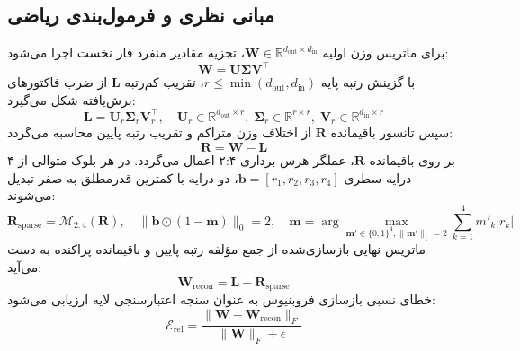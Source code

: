 \subsection{مبانی نظری و فرمول‌بندی ریاضی}
برای ماتریس وزن اولیه $\mathbf{W} \in \mathbb{R}^{d_{\text{out}} \times d_{\text{in}}}$، تجزیه مقادیر منفرد فاز نخست اجرا می‌شود:
\begin{equation}
\mathbf{W} = \mathbf{U} \mathbf{\Sigma} \mathbf{V}^\top
\end{equation}
با گزینش رتبه پایه $r \le \min(d_{\text{out}}, d_{\text{in}})$، تقریب کم‌رتبه $\mathbf{L}$ از ضرب فاکتورهای برش‌یافته شکل می‌گیرد:
\begin{equation}
\mathbf{L} = \mathbf{U}_r \mathbf{\Sigma}_r \mathbf{V}_r^\top, \quad \mathbf{U}_r \in \mathbb{R}^{d_{\text{out}} \times r}, \; \mathbf{\Sigma}_r \in \mathbb{R}^{r \times r}, \; \mathbf{V}_r \in \mathbb{R}^{d_{\text{in}} \times r}
\end{equation}
سپس تانسور باقیمانده $\mathbf{R}$ از اختلاف وزن متراکم و تقریب رتبه پایین محاسبه می‌گردد:
\begin{equation}
\mathbf{R} = \mathbf{W} - \mathbf{L}
\end{equation}
بر روی باقیمانده $\mathbf{R}$، عملگر هرس برداری ۲:۴ اعمال می‌گردد. در هر بلوک متوالی از ۴ درایه سطری $\mathbf{b} = [r_1, r_2, r_3, r_4]$، دو درایه با کمترین قدرمطلق به صفر تبدیل می‌شوند:
\begin{equation}
\mathbf{R}_{\text{sparse}} = \mathcal{M}_{2:4}(\mathbf{R}), \quad \|\mathbf{b} \odot (1 - \mathbf{m})\|_0 = 2, \quad \mathbf{m} = \arg\max_{\mathbf{m}' \in \{0, 1\}^4, \|\mathbf{m}'\|_1=2} \sum_{k=1}^4 m'_k |r_k|
\end{equation}
ماتریس نهایی بازسازی‌شده از جمع مؤلفه رتبه پایین و باقیمانده پراکنده به دست می‌آید:
\begin{equation}
\mathbf{W}_{\text{recon}} = \mathbf{L} + \mathbf{R}_{\text{sparse}}
\end{equation}
خطای نسبی بازسازی فروبنیوس به عنوان سنجه اعتبارسنجی لایه ارزیابی می‌شود:
\begin{equation}
\mathcal{E}_{\text{rel}} = \frac{\|\mathbf{W} - \mathbf{W}_{\text{recon}}\|_F}{\|\mathbf{W}\|_F + \epsilon}
\end{equation}

